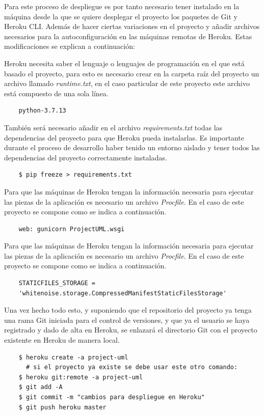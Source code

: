\documentclass[a4paper, 12pt]{book}
\begin{document}
Para este proceso de despliegue es por tanto necesario tener instalado en la máquina desde la que se quiere desplegar el proyecto los paquetes de Git y Heroku CLI. Además de hacer ciertas variaciones en el proyecto y añadir archivos necesarios para la autoconfiguración en las máquinas remotas de Heroku. Estas modificaciones se explican a continuación: 

Heroku necesita saber el lenguaje o lenguajes de programación en el que está basado el proyecto, para esto es necesario  crear en la carpeta raíz del proyecto un archivo llamado \emph{runtime.txt}, en el caso particular de este proyecto este archivo está compuesto de una sola línea. 
\begin{verbatim}
	python-3.7.13
\end{verbatim}

También será necesario añadir en el archivo \emph{requirements.txt} todas las dependencias del proyecto para que Heroku pueda instalarlas. Es importante durante el proceso de desarrollo haber tenido un entorno aislado y tener todos las dependencias del proyecto correctamente instaladas. 
\begin{verbatim}
	$ pip freeze > requirements.txt
\end{verbatim}

Para que las máquinas de Heroku tengan la información necesaria para ejecutar las piezas de la aplicación es necesario un archivo \emph{Procfile}. En el caso de este proyecto se compone como se indica a continuación. 
\begin{verbatim}
	web: gunicorn ProjectUML.wsgi 
\end{verbatim}


Para que las máquinas de Heroku tengan la información necesaria para ejecutar las piezas de la aplicación es necesario un archivo \emph{Procfile}. En el caso de este proyecto se compone como se indica a continuación. 
\begin{verbatim}
	STATICFILES_STORAGE = 
	'whitenoise.storage.CompressedManifestStaticFilesStorage'
\end{verbatim}

Una vez hecho todo esto, y suponiendo que el repositorio del proyecto ya tenga una rama Git iniciada para el control de versiones, y que ya el usuario se haya registrado y dado de alta en Heroku, se enlazará el directorio Git con el proyecto existente en Heroku de manera local.
\begin{verbatim}
	$ heroku create -a project-uml 
	  # si el proyecto ya existe se debe usar este otro comando: 
	$ heroku git:remote -a project-uml 
	$ git add -A
	$ git commit -m "cambios para despliegue en Heroku"
	$ git push heroku master
\end{verbatim}
\end{document}
